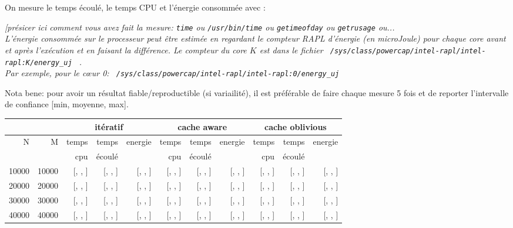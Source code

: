 \documentclass[10pt,a4paper]{article}
\begin{document}
On mesure le temps écoulé, le temps CPU et l'énergie consommée avec : {\em  [présicer ici comment vous avez fait la mesure:
{\tt time} 
ou {\tt /usr/bin/time}
ou {\tt getimeofday}
ou {\tt getrusage}
ou... \\
L'énergie consommée sur le processeur peut être estimée en regardant le compteur RAPL d'énergie (en microJoule)
pour chaque core avant et après l'exécution et en faisant la différence.
Le compteur du core $K$ est dans le fichier 
\verb+ /sys/class/powercap/intel-rapl/intel-rapl:K/energy_uj + .\\
Par exemple, pour le c{\oe}ur 0: 
\verb+ /sys/class/powercap/intel-rapl/intel-rapl:0/energy_uj +

Nota bene: pour avoir un résultat fiable/reproductible (si variailité), 
il est préférable de faire chaque mesure 5 fois et de reporter l'intervalle
de confiance [min, moyenne, max]. 

\begin{tabular}{|r|r||r|r|r||r|r|r||r|r|r||}
\hline
 \multicolumn{2}{|c||}{ } 
& \multicolumn{3}{c||}{itératif}
& \multicolumn{3}{c||}{cache aware}
& \multicolumn{3}{c||}{cache oblivious}
\\ \hline
N & M 
& temps   & temps & energie       %
& temps   & temps & energie       %
& temps   & temps & energie       %
\\
& 
& cpu     & écoulé&               %
& cpu     & écoulé&               %
& cpu     & écoulé&               %
\\ \hline
\hline
10000 & 10000 
& [, , ] & [, , ] & [, , ]  %
& [, , ] & [, , ] & [, , ]  %
& [, , ] & [, , ] & [, , ]  %
\\ \hline
20000 & 20000 
& [, , ] & [, , ] & [, , ]  %
& [, , ] & [, , ] & [, , ]  %
& [, , ] & [, , ] & [, , ]  %
\\ \hline
30000 & 30000 
& [, , ] & [, , ] & [, , ]  %
& [, , ] & [, , ] & [, , ]  %
& [, , ] & [, , ] & [, , ]  %
\\ \hline
40000 & 40000 
& [, , ] & [, , ] & [, , ]  %
& [, , ] & [, , ] & [, , ]  %
& [, , ] & [, , ] & [, , ]  %
\\ \hline
\hline
\end{tabular}
}
\end{document}
